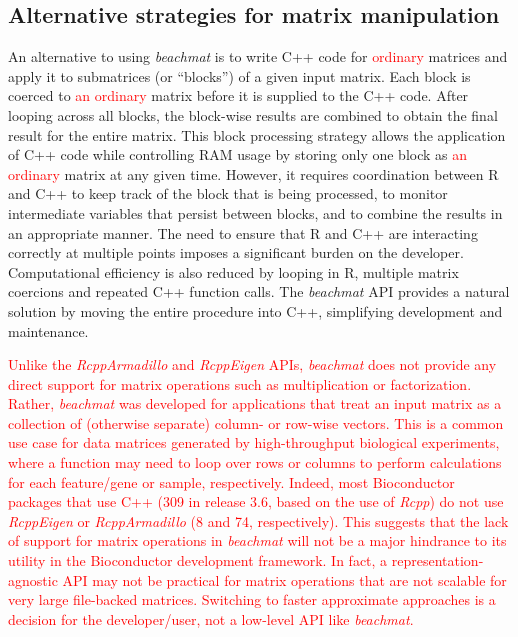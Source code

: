 \documentclass[10pt,letterpaper]{article}
\newcommand{\suppseclayoutoptim}{2}
\newcommand{\beachmat}{\textit{beachmat}}
\newcommand{\revised}[1]{\textcolor{red}{#1}}
\begin{document}

\subsection*{Alternative strategies for matrix manipulation}
An alternative to using \beachmat{} is to write C++ code for \revised{ordinary} matrices and apply it to submatrices (or ``blocks'') of a given input matrix.
Each block is coerced to \revised{an ordinary} matrix before it is supplied to the C++ code.
After looping across all blocks, the block-wise results are combined to obtain the final result for the entire matrix.
This block processing strategy allows the application of C++ code while controlling RAM usage by storing only one block as \revised{an ordinary} matrix at any given time.
However, it requires coordination between R and C++ to keep track of the block that is being processed, to monitor intermediate variables that persist between blocks, and to combine the results in an appropriate manner.
The need to ensure that R and C++ are interacting correctly at multiple points imposes a significant burden on the developer.
Computational efficiency is also reduced by looping in R, multiple matrix coercions and repeated C++ function calls.
The \beachmat{} API provides a natural solution by moving the entire procedure into C++, simplifying development and maintenance.

\revised{Unlike the \textit{RcppArmadillo} and \textit{RcppEigen} APIs, \beachmat{} does not provide any direct support for matrix operations such as multiplication or factorization.
Rather, \beachmat{} was developed for applications that treat an input matrix as a collection of (otherwise separate) column- or row-wise vectors.
This is a common use case for data matrices generated by high-throughput biological experiments, where a function may need to loop over rows or columns to perform calculations for each feature/gene or sample, respectively.
Indeed, most Bioconductor packages that use C++ (309 in release 3.6, based on the use of \textit{Rcpp}) do not use \textit{RcppEigen} or \textit{RcppArmadillo} (8 and 74, respectively).
This suggests that the lack of support for matrix operations in \beachmat{} will not be a major hindrance to its utility in the Bioconductor development framework.
In fact, a representation-agnostic API may not be practical for matrix operations that are not scalable for very large file-backed matrices.
Switching to faster approximate approaches is a decision for the developer/user, not a low-level API like \beachmat{}.}
\end{document}
